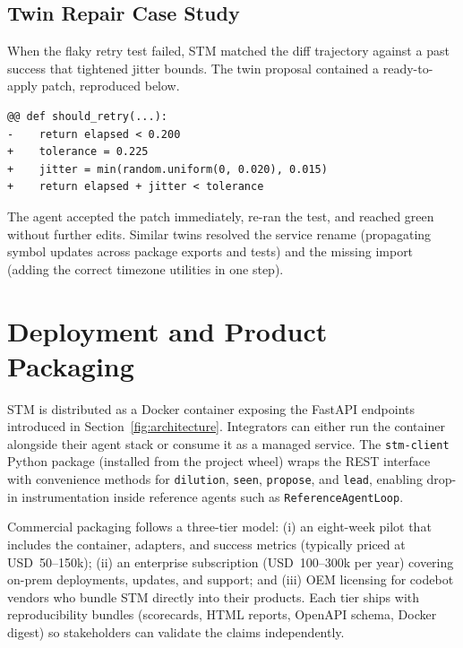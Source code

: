 \documentclass[11pt]{article}
\begin{document}
\subsection{Twin Repair Case Study}
When the flaky retry test failed, STM matched the diff trajectory against a past success that tightened jitter bounds. The twin proposal contained a ready-to-apply patch, reproduced below.

\begin{lstlisting}[style=stm, caption={Twin patch applied during the flaky retry repair.}, label={lst:retry-twin}]
@@ def should_retry(...):
-    return elapsed < 0.200
+    tolerance = 0.225
+    jitter = min(random.uniform(0, 0.020), 0.015)
+    return elapsed + jitter < tolerance
\end{lstlisting}

The agent accepted the patch immediately, re-ran the test, and reached green without further edits. Similar twins resolved the service rename (propagating symbol updates across package exports and tests) and the missing import (adding the correct timezone utilities in one step).

\section{Deployment and Product Packaging}
STM is distributed as a Docker container exposing the FastAPI endpoints introduced in Section~\ref{fig:architecture}. Integrators can either run the container alongside their agent stack or consume it as a managed service. The \texttt{stm-client} Python package (installed from the project wheel) wraps the REST interface with convenience methods for \texttt{dilution}, \texttt{seen}, \texttt{propose}, and \texttt{lead}, enabling drop-in instrumentation inside reference agents such as \texttt{ReferenceAgentLoop}.

Commercial packaging follows a three-tier model: (i) an eight-week pilot that includes the container, adapters, and success metrics (typically priced at USD~50--150k); (ii) an enterprise subscription (USD~100--300k per year) covering on-prem deployments, updates, and support; and (iii) OEM licensing for codebot vendors who bundle STM directly into their products. Each tier ships with reproducibility bundles (scorecards, HTML reports, OpenAPI schema, Docker digest) so stakeholders can validate the claims independently.
\end{document}
